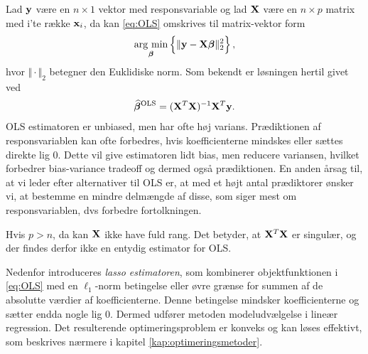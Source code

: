 Lad \(\mathbf{y}\) være en \(n \times 1\) vektor med responsvariable og lad \(\mathbf{X}\) være en $n \times p$ matrix med  i'te række $\mathbf{x}_i$, da kan \eqref{eq:OLS} omskrives til matrix-vektor form
\begin{align*}
\argmin_{ \tbeta} \cbr{ \Vert \y - \X \tbeta \Vert_2^2},
\end{align*}
hvor \(\Vert \cdot \Vert_2\) betegner den Euklidiske norm.
Som bekendt er løsningen hertil givet ved
\begin{align*}
\widehat{\boldsymbol{\beta}}^{\text{OLS}} = (\mathbf{X}^T \mathbf{X})^{-1} \mathbf{X}^T \mathbf{y}.
\end{align*}
OLS estimatoren er unbiased, men har ofte høj varians. 
Prædiktionen af responsvariablen kan ofte forbedres, hvis koefficienterne mindskes eller sættes direkte lig 0.
Dette vil give estimatoren lidt bias, men reducere variansen, hvilket forbedrer bias-variance tradeoff og dermed også prædiktionen.
En anden årsag til, at vi leder efter alternativer til OLS er, at med et højt antal prædiktorer ønsker vi, at bestemme en mindre delmængde af disse, som siger mest om responsvariablen, dvs forbedre fortolkningen.

Hvis \(p > n\), da kan \(\mathbf{X}\) ikke have fuld rang.
Det betyder, at $\mathbf{X}^T \mathbf{X}$ er singulær, og der findes derfor ikke en entydig estimator for OLS.

Nedenfor introduceres \textit{lasso estimatoren}, som kombinerer objektfunktionen i \eqref{eq:OLS} med en $\ell_1$-norm betingelse eller øvre grænse for summen af de absolutte værdier af koefficienterne.
Denne betingelse mindsker koefficienterne og sætter endda nogle lig 0. 
Dermed udfører metoden modeludvælgelse i lineær regression.
Det resulterende optimeringsproblem er konveks og kan løses effektivt, som beskrives nærmere i kapitel \ref{kap:optimeringsmetoder}.
%




%